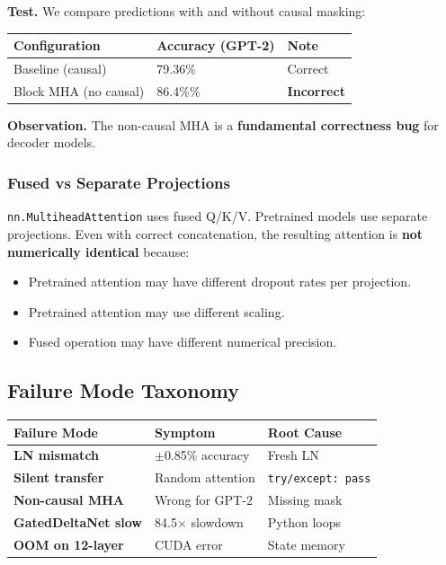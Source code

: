 \textbf{Test.} We compare predictions with and without causal masking:

\begin{table}[H]
\centering
\small
\begin{tabular}{lll}
\toprule
\textbf{Configuration} & \textbf{Accuracy (GPT-2)} & \textbf{Note} \\
\midrule
Baseline (causal) & 79.36\% & Correct \\
Block MHA (no causal) & 86.4\%\% & \textbf{Incorrect} \\
\bottomrule
\end{tabular}
\end{table}

\textbf{Observation.} The non-causal MHA is a \textbf{fundamental correctness bug} for 
decoder models.

\subsubsection{Fused vs Separate Projections}

\texttt{nn.MultiheadAttention} uses fused Q/K/V. Pretrained models use separate 
projections. Even with correct concatenation, the resulting attention is 
\textbf{not numerically identical} because:

\begin{itemize}
\item Pretrained attention may have different dropout rates per projection.
\item Pretrained attention may use different scaling.
\item Fused operation may have different numerical precision.

\end{itemize}
\subsection{Failure Mode Taxonomy}

\begin{table}[H]
\centering
\small
\begin{tabular}{lll}
\toprule
\textbf{Failure Mode} & \textbf{Symptom} & \textbf{Root Cause} \\
\midrule
\textbf{LN mismatch} & $\pm$0.85\% accuracy & Fresh LN \\
\textbf{Silent transfer} & Random attention & \texttt{try/except: pass} \\
\textbf{Non-causal MHA} & Wrong for GPT-2 & Missing mask \\
\textbf{GatedDeltaNet slow} & 84.5$\times$ slowdown & Python loops \\
\textbf{OOM on 12-layer} & CUDA error & State memory \\
\bottomrule
\end{tabular}
\end{table}

